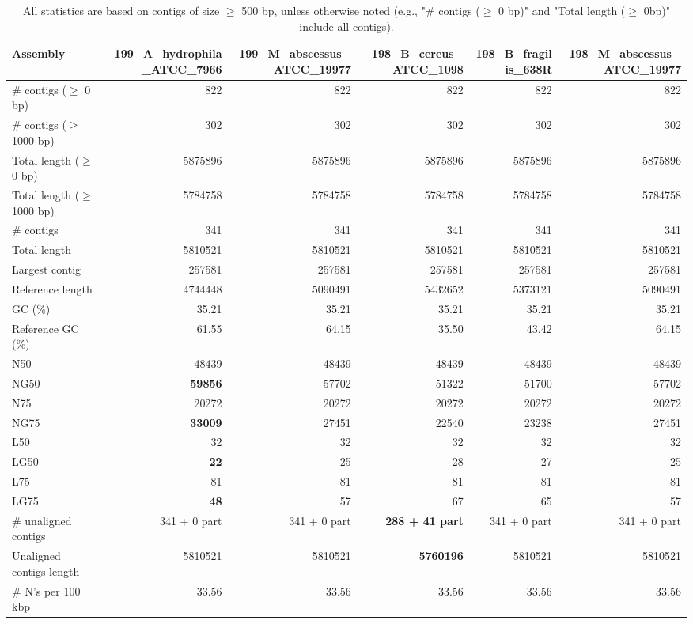 \documentclass[12pt,a4paper]{article}
\begin{document}
\begin{table}[ht]
\begin{center}
\caption{All statistics are based on contigs of size $\geq$ 500 bp, unless otherwise noted (e.g., "\# contigs ($\geq$ 0 bp)" and "Total length ($\geq$ 0bp)" include all contigs).}
\begin{tabular}{|l*{5}{|r}|}
\hline
Assembly & 199\_A\_hydrophila\_ATCC\_7966 & 199\_M\_abscessus\_ATCC\_19977 & 198\_B\_cereus\_ATCC\_1098 & 198\_B\_fragilis\_638R & 198\_M\_abscessus\_ATCC\_19977 \\ \hline
\# contigs ($\geq$ 0 bp) & 822 & 822 & 822 & 822 & 822 \\ \hline
\# contigs ($\geq$ 1000 bp) & 302 & 302 & 302 & 302 & 302 \\ \hline
Total length ($\geq$ 0 bp) & 5875896 & 5875896 & 5875896 & 5875896 & 5875896 \\ \hline
Total length ($\geq$ 1000 bp) & 5784758 & 5784758 & 5784758 & 5784758 & 5784758 \\ \hline
\# contigs & 341 & 341 & 341 & 341 & 341 \\ \hline
Total length & 5810521 & 5810521 & 5810521 & 5810521 & 5810521 \\ \hline
Largest contig & 257581 & 257581 & 257581 & 257581 & 257581 \\ \hline
Reference length & 4744448 & 5090491 & 5432652 & 5373121 & 5090491 \\ \hline
GC (\%) & 35.21 & 35.21 & 35.21 & 35.21 & 35.21 \\ \hline
Reference GC (\%) & 61.55 & 64.15 & 35.50 & 43.42 & 64.15 \\ \hline
N50 & 48439 & 48439 & 48439 & 48439 & 48439 \\ \hline
NG50 & {\bf 59856} & 57702 & 51322 & 51700 & 57702 \\ \hline
N75 & 20272 & 20272 & 20272 & 20272 & 20272 \\ \hline
NG75 & {\bf 33009} & 27451 & 22540 & 23238 & 27451 \\ \hline
L50 & 32 & 32 & 32 & 32 & 32 \\ \hline
LG50 & {\bf 22} & 25 & 28 & 27 & 25 \\ \hline
L75 & 81 & 81 & 81 & 81 & 81 \\ \hline
LG75 & {\bf 48} & 57 & 67 & 65 & 57 \\ \hline
\# unaligned contigs & 341 + 0 part & 341 + 0 part & {\bf 288 + 41 part} & 341 + 0 part & 341 + 0 part \\ \hline
Unaligned contigs length & 5810521 & 5810521 & {\bf 5760196} & 5810521 & 5810521 \\ \hline
\# N's per 100 kbp & 33.56 & 33.56 & 33.56 & 33.56 & 33.56 \\ \hline
\end{tabular}
\end{center}
\end{table}
\end{document}
